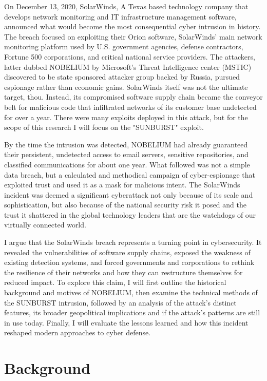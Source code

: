 \documentclass[conference]{IEEEtran}
\begin{document}
On December 13, 2020, SolarWinds, A Texas based technology company that develops network monitoring and IT 
infrastructure management software, announced what would become the most consequential cyber intrusion in history.
The breach focused on exploiting their Orion software, SolarWinds' main network monitoring platform used by U.S. 
government agencies, defense contractors, Fortune 500 corporations, and critical national service providers. 
The attackers, latter dubbed NOBELIUM by Microsoft's Threat Intelligence center (MSTIC) discovered to be
state sponsored attacker group backed by Russia, pursued espionage rather than economic gains.
SolarWinds itself was not the ultimate target, thou. Instead, its compromised software supply chain became the conveyor belt for malicious 
code that infiltrated networks of its customer base undetected for over a year. There were many exploits deployed in this attack, but for the 
scope of this research I will focus on the "SUNBURST" exploit.

By the time the intrusion was detected, NOBELIUM had already guaranteed their persistent, undetected access to email servers,
sensitive repositories, and classified communications for about one year. What followed was not a simple data breach, but a calculated and methodical 
campaign of cyber-espionage that exploited trust and used it as a mask for malicious intent. The SolarWinds incident was deemed a 
significant cyberattack not only because of its scale and sophistication, but also because of the national security risk it posed and 
the trust it shattered in the global technology leaders that are the watchdogs of our virtually connected world.

I argue that the SolarWinds breach represents a turning point in cybersecurity. It revealed the vulnerabilities of software supply 
chains, exposed the weakness of existing detection systems, and forced governments and corporations to rethink the resilience of their 
networks and how they can restructure themselves for reduced impact. To explore this claim, I will first outline the historical 
background and motives of NOBELIUM, then examine the technical methods of the SUNBURST intrusion, followed by an analysis of the attack's distinct 
features, its broader geopolitical implications and if the attack's patterns are still in use today. Finally, I will evaluate the lessons 
learned and how this incident reshaped modern approaches to cyber defense.


\section{Background}
\end{document}
